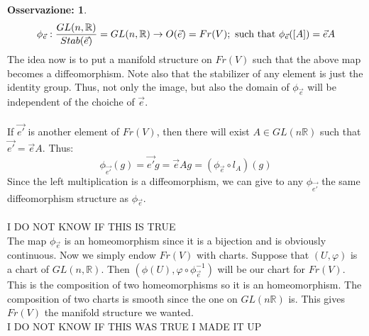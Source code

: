 \documentclass[12pt,a4paper]{report}
\theoremstyle{definition}
\theoremstyle{Theorem}
\theoremstyle{definition}
\theoremstyle{definition}
\theoremstyle{definition}
\newtheorem{Obs}[Def]{Osservazione:}
\begin{document}
\begin{Obs}
		$$\phi_{\vec{e}}:{GL(n,\mathbb{R})\over Stab(\vec{e})}=GL(n,\mathbb{R})\rightarrow O(\vec{e})=Fr(V);\hbox{ such that } \phi_{\vec{e}}([A])=\vec{e}A$$
		The idea now is to put a manifold structure on $Fr(V)$ such that the above map becomes a diffeomorphism. Note also that the stabilizer of any element is just the identity group. Thus, not only the image, but also the domain of $\phi_{\vec{e}}$ will be independent of the choiche of $\vec{e}$.\\
		\\
		If $\vec{e'}$ is another element of $Fr(V)$, then there will exist $A\in GL(n\mathbb{R})$ such that $\vec{e'}=\vec{e}A$. Thus:
		$$\phi_{\vec{e'}}(g)=\vec{e'}g=\vec{e}Ag=(\phi_{\vec{e}}\circ l_A)(g)$$
		Since the left multiplication is a diffeomorphism, we can give to any $\phi_{\vec{e'}}$ the same diffeomorphism structure as $\phi_{\vec{e}}$.\\
		\\
		I DO NOT KNOW IF THIS IS TRUE\\
		The map $\phi_{\vec{e}}$ is an homeomorphism since it is a bijection and is obviously continuous. Now we simply endow $Fr(V)$ with charts. Suppose that $(U,\varphi)$ is a chart of $GL(n,\mathbb{R})$. Then $(\phi(U),\varphi\circ\phi^{-1}_{\vec{e}})$ will be our chart for $Fr(V)$. This is the composition of two homeomorphisms so it is an homeomorphism. The composition of two charts is smooth since the one on $GL(n\mathbb{R})$ is. This gives $Fr(V)$ the manifold structure we wanted.\\
		I DO NOT KNOW IF THIS WAS TRUE I MADE IT UP
		\end{Obs}
\end{document}
